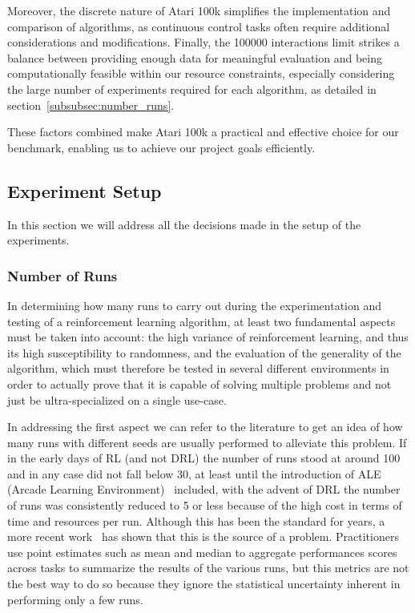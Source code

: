 Moreover, the discrete nature of Atari 100k simplifies the implementation and comparison of algorithms, as continuous control tasks often require additional considerations and modifications. Finally, the \num{100000} interactions limit strikes a balance between providing enough data for meaningful evaluation and being computationally feasible within our resource constraints, especially considering the large number of experiments required for each algorithm, as detailed in section~\vref{subsubsec:number_runs}.

These factors combined make Atari 100k a practical and effective choice for our benchmark, enabling us to achieve our project goals efficiently.


\subsection{Experiment Setup}
\label{subsec:experiment_setup}
In this section we will address all the decisions made in the setup of the experiments.

\subsubsection{Number of Runs}
\label{subsubsec:number_runs}

In determining how many runs to carry out during the experimentation and testing of a reinforcement learning algorithm, at least two fundamental aspects must be taken into account: the high variance of reinforcement learning, and thus its high susceptibility to randomness, and the evaluation of the generality of the algorithm, which must therefore be tested in several different environments in order to actually prove that it is capable of solving multiple problems and not just be ultra-specialized on a single use-case.

In addressing the first aspect we can refer to the literature to get an idea of how many runs with different seeds are usually performed to alleviate this problem. If in the early days of RL (and not DRL) the number of runs stood at around 100 and in any case did not fall below 30, at least until the introduction of ALE (Arcade Learning Environment)~\cite{bellemare:ale} included, with the advent of DRL the number of runs was consistently reduced to 5 or less because of the high cost in terms of time and resources per run. Although this has been the standard for years, a more recent work~\cite{agarwal:statistical_precipice} has shown that this is the source of a problem. Practitioners use point estimates such as mean and median to aggregate performances  scores across tasks to summarize the results of the various runs, but this metrics are not the best way to do so because they ignore the statistical uncertainty inherent in performing only a few runs.

